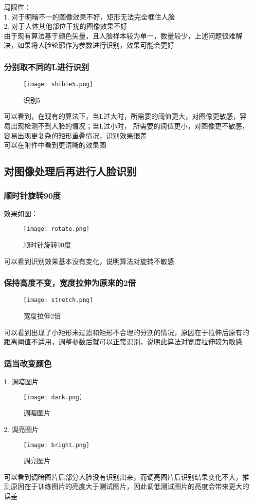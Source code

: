 \documentclass[12pt]{article}
\begin{document}
局限性：\\
1. 对于明暗不一的图像效果不好，矩形无法完全框住人脸\\
2. 对于人体其他部位干扰的图像效果不好\\

由于现有算法基于颜色矢量，且人脸样本较为单一，数量较少，上述问题很难解决，如果将人脸轮廓作为参数进行识别，效果可能会更好

\subsubsection{分别取不同的L进行识别}
\begin{figure}[H]
    \centering
    \texttt{[image: shibie5.png]}
    \caption{识别5}
\end{figure}
可以看到，在现有的算法下，当L过大时，所需要的阈值更大，对图像更敏感，容易出现检测不到人脸的情况；当L过小时，
所需要的阈值更小，对图像更不敏感，容易出现更复杂的矩形重叠情况，识别效果很差\\
\hspace*{2em}可以在附件中看到更清晰的效果图

\subsection{对图像处理后再进行人脸识别}
\subsubsection{顺时针旋转90度}
效果如图：
\begin{figure}[H]
    \centering
    \texttt{[image: rotate.png]}
    \caption{顺时针旋转90度}
\end{figure}
可以看到识别效果基本没有变化，说明算法对旋转不敏感
\subsubsection{保持高度不变，宽度拉伸为原来的2倍}
\begin{figure}[H]
    \centering
    \texttt{[image: stretch.png]}
    \caption{宽度拉伸2倍}
\end{figure}
可以看到出现了小矩形未过滤和矩形不合理的分割的情况，原因在于拉伸后原有的距离阈值不适用，调整参数后就可以正常识别，说明此算法对宽度拉伸较为敏感
\subsubsection{适当改变颜色}
1. 调暗图片
\begin{figure}[H]
    \centering
    \texttt{[image: dark.png]}
    \caption{调暗图片}
\end{figure}
2. 调亮图片
\begin{figure}[H]
    \centering
    \texttt{[image: bright.png]}
    \caption{调亮图片}
\end{figure}
可以看到调暗图片后部分人脸没有识别出来，而调亮图片后识别结果变化不大，推测原因在于训练图片的亮度大于测试图片，因此调低测试图片的亮度会带来更大的误差
\end{document}

